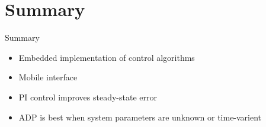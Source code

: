 \documentclass{beamer}
\begin{document}
\section*{Summary}
\begin{frame}{Summary} %
  \begin{itemize}
    \item Embedded implementation of control algorithms
    \item Mobile interface
    \item PI control improves steady-state error
    \item ADP is best when system parameters are unknown or time-varient
  \end{itemize}
  
\end{frame}
  
\end{document}
